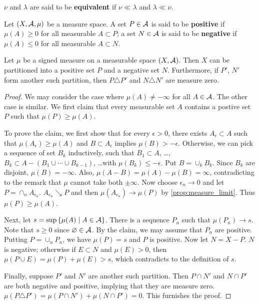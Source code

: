 \begin{definition}
    $\nu$ and $\lambda$ are said to be \textbf{equivalent} if $\nu\ll\lambda$ 
    and $\lambda\ll\nu$.
\end{definition}

\begin{definition}
    Let $(X,\mathcal{A},\mu)$ be a measure space. A set $P\in\mathcal{A}$ is said to be 
    \textbf{positive} if $\mu(A)\geq 0$ for all measurable $A\subset P$; 
    a set $N\in\mathcal{A}$ is said to be \textbf{negative} if $\mu(A)\leq 0$ for 
    all measurable $A\subset N$.
\end{definition}

\begin{theorem}
    Let $\mu$ be a signed measure on a measurable space $(X,\mathcal{A})$. Then 
    $X$ can be partitioned into a positive set $P$ and a negative set $N$. 
    Furthermore, if $P'$, $N'$ form another such partition, then 
    $P\triangle P'$ and $N\triangle N'$ are measure zero.
\end{theorem}
\begin{proof}
    We may consider the case where $\mu(A)\neq -\infty$ for all $A\in\mathcal{A}$. 
    The other case is similar. We first claim that every measurable set 
    $A$ contains a postive set $P$ such that $\mu(P)\geq\mu(A)$. 

    To prove the claim, we first show that for every $\epsilon>0$, 
    there exists $A_\epsilon\subset A$ such that $\mu(A_\epsilon)
    \geq\mu(A)$ and $B\subset A_\epsilon$ implies $\mu(B)>-\epsilon$. 
    Otherwise, we can pick a sequence of set $B_k$ inductively, 
    such that $B_1\subset A$, \ldots, 
    $B_k\subset A-(B_1\cup\cdots\cup B_{k-1})$, \ldots with 
    $\mu(B_k)\leq -\epsilon$. Put $B = \cup_k B_k$. Since $B_k$ 
    are disjoint, $\mu(B) = -\infty$. Also, $\mu(A-B) = \mu(A)-\mu(B) 
    = \infty$, contradicting to the remark that $\mu$ cannot 
    take both $\pm\infty$. Now choose $\epsilon_n\to 0$ and let 
    $P = \cap_n A_{\epsilon_n}$. $A_{\epsilon_n}\searrow P$ and then 
    $\mu(A_{\epsilon_n})\to\mu(P)$ by \cref{prop:measure_limit}. 
    Thus $\mu(P)\geq\mu(A)$.

    Next, let $s = \sup\left\{ \mu(A) \;\middle\vert\; A\in\mathcal{A} \right\}$. There is a sequence 
    $P_n$ such that $\mu(P_n)\to s$. Note that $s\geq 0$ since 
    $\varnothing\in\mathcal{A}$. By the claim, we may assume that $P_n$ are 
    positive. Putting $P = \cup_n P_n$, we have $\mu(P) = s$ 
    and $P$ is positive. Now let $N = X-P$. $N$ is negative; 
    otherwise if $E\subset N$ and $\mu(E)>0$, then $\mu(P\cup E) 
    = \mu(P) + \mu(E) > s$, which contradicts to the definition 
    of $s$. 

    Finally, suppose $P'$ and $N'$ are another such partition. 
    Then $P\cap N'$ and $N\cap P'$ are both negative and positive, 
    implying that they are measure zero. $\mu(P\triangle P') 
    = \mu(P\cap N') + \mu(N\cap P') = 0$. This furnishes the 
    proof.
\end{proof}

